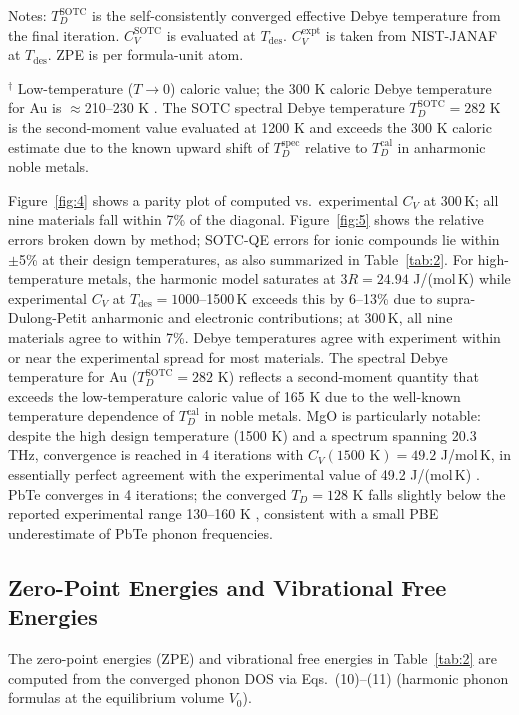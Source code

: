\documentclass[aps,prb,reprint,amsmath,amssymb,floatfix]{revtex4-2}
\begin{document}
Notes: \(T_D^\text{SOTC}\) is the self-consistently converged effective
Debye temperature from the final iteration. \(C_V^\text{SOTC}\) is
evaluated at \(T_\text{des}\). \(C_V^\text{expt}\) is taken from
NIST-JANAF at \(T_\text{des}\). ZPE is per formula-unit atom.

\(^\dagger\) Low-temperature (\(T\to0\)) caloric value; the 300 K
caloric Debye temperature for Au is $\approx$210--230 K \cite{ref24}.
The SOTC spectral Debye temperature \(T_D^\text{SOTC} = 282\) K is the
second-moment value evaluated at 1200 K and exceeds the 300 K caloric
estimate due to the known upward shift of \(T_D^\text{spec}\) relative to
\(T_D^\text{cal}\) in anharmonic noble metals.

Figure~\ref{fig:4} shows a parity plot of computed vs.\ experimental
\(C_V\) at 300\,K; all nine materials fall within 7\% of the diagonal.
Figure~\ref{fig:5} shows the relative errors broken down by method;
SOTC-QE errors for ionic compounds lie within \(\pm\)5\% at their design
temperatures, as also summarized in Table~\ref{tab:2}. For
high-temperature metals, the harmonic model saturates at
$3R = 24.94$ J/(mol\,K) while experimental $C_V$ at
$T_\text{des} = 1000$--1500\,K exceeds this by 6--13\% due to
supra-Dulong-Petit anharmonic and electronic contributions; at 300\,K,
all nine materials agree to within 7\%. Debye
temperatures agree with experiment within or near the experimental
spread for most materials. The spectral Debye temperature for Au
(\(T_D^\text{SOTC} = 282\) K) reflects a second-moment quantity that
exceeds the low-temperature caloric value of 165 K \cite{ref24} due to
the well-known temperature dependence of \(T_D^\text{cal}\) in noble
metals. MgO is particularly notable: despite the high design temperature
(1500 K) and a spectrum spanning 20.3 THz, convergence is reached in 4
iterations with \(C_V(1500\text{ K}) = 49.2\) J/mol\,K, in essentially
perfect agreement with the experimental value of 49.2 J/(mol\,K)
\cite{ref29}. PbTe converges in 4 iterations; the converged
\(T_D = 128\) K falls slightly below the reported experimental range
130--160 K \cite{ref31}, consistent with a small PBE underestimate of
PbTe phonon frequencies.

\subsection{Zero-Point Energies and Vibrational Free
Energies}\label{zero-point-energies-and-vibrational-free-energies}

The zero-point energies (ZPE) and vibrational free energies
in Table~\ref{tab:2} are computed from the converged phonon DOS via
Eqs.~(10)--(11) (harmonic phonon formulas at the equilibrium volume
\(V_0\)).
\end{document}
